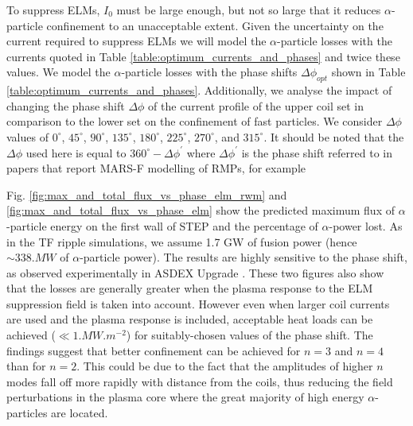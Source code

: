 \documentclass[10pt, a4paper, twoside]{article}
\begin{document}
To suppress ELMs, $I_0$ must be large enough, but not so large that it reduces $\alpha$-particle confinement to an unacceptable extent. Given the uncertainty on the current required to suppress ELMs we will model the $\alpha$-particle losses with the currents quoted in Table \ref{table:optimum_currents_and_phases} and twice these values.
We model the $\alpha$-particle losses with the phase shifts $\Delta\phi_{opt}$ shown in Table \ref{table:optimum_currents_and_phases}. Additionally, we analyse the impact of changing the phase shift $\Delta\phi$ of the current profile of the upper coil set in comparison to the lower set on the confinement of fast particles. We consider $\Delta\phi$ values of $0^\circ$, $45^\circ$, $90^\circ$, $135^\circ$, $180^\circ$, $225^\circ$, $270^\circ$, and $315^\circ$. It should be noted that the $\Delta\phi$ used here is equal to $360^{\circ}-\Delta\phi^{\prime}$ where $\Delta\phi^{\prime}$ is the phase shift referred to in papers that report MARS-F modelling of RMPs, for example \cite{ryan2017}   

Fig. \ref{fig:max_and_total_flux_vs_phase_elm_rwm} and \ref{fig:max_and_total_flux_vs_phase_elm} show the predicted maximum flux of $\alpha$-particle energy on the first wall of STEP and the percentage of $\alpha$-power lost. As in the TF ripple simulations, we assume 1.7 GW of fusion power (hence $\sim\si{338.MW}$ of $\alpha$-particle power). The results are highly sensitive to the phase shift, as observed experimentally in ASDEX Upgrade \cite{sanchis2018}. These two figures also show that the losses are generally greater when the plasma response to the ELM suppression field is taken into account. However even when larger coil currents are used and the plasma response is included, acceptable heat loads can be achieved ($\ll \si{1.MW.m^{-2}}$) for suitably-chosen values of the phase shift. The findings suggest that better confinement can be achieved for $n=3$ and $n=4$ than for $n=2$. This could be due to the fact that the amplitudes of higher $n$ modes fall off more rapidly with distance from the coils, thus reducing the field perturbations in the plasma core where the great majority of high energy $\alpha$-particles are located.
\end{document}
